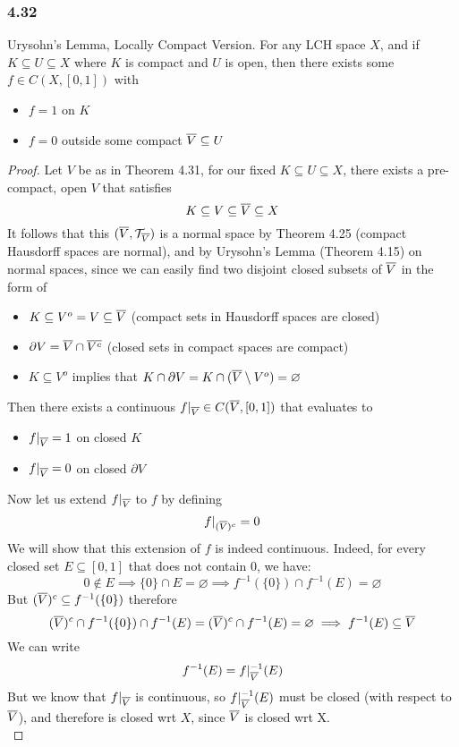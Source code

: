 \documentclass[../../main.tex]{subfiles}
\begin{document}
\subsubsection*{4.32}
\begin{wts}
    Urysohn's Lemma, Locally Compact Version. For any LCH space $X$, and if $K\subseteq U\subseteq X$ where $K$ is compact and $U$ is open, then there exists some $f\in C(X,[0,1])$ with \begin{itemize}
        \item $f=1$ on $K$
        \item $f=0$ outside some compact $\overline{V}\subseteq U$
    \end{itemize}
\end{wts}
\newcommand{\restrictV}{|_{\cl{V}}}
\begin{proof}
    Let $V$ be as in Theorem 4.31, for our fixed $K\subseteq U\subseteq X$, there exists a pre-compact, open $V$ that satisfies
    \[
    K\subseteq V\subseteq \overline{V}\subseteq X
    \]
    It follows that this $(\overline{V},\mathcal{T}_{\overline{V}})$ is a normal space by Theorem 4.25 (compact Hausdorff spaces are normal), and by Urysohn's Lemma (Theorem 4.15) on normal spaces, since we can easily find two disjoint closed subsets of $\overline{V}$ in the form of \begin{itemize}
        \item $K\subseteq V^o = V\subseteq \overline{V}$ (compact sets in Hausdorff spaces are closed)
        \item $\partial V=\overline{V}\cap\overline{V^c}$ (closed sets in compact spaces are compact)
        \item $K\subseteq V^o$ implies that $K\cap\partial V =K\cap(\overline{V}\setminus V^o)= \varnothing$
    \end{itemize}
    Then there exists a continuous $f\restrictV\in C(\cl{V},[0,1])$ that evaluates to
    \begin{itemize}
        \item $f\restrictV = 1$ on closed $K$
        \item $f\restrictV = 0$ on closed $\partial V$
    \end{itemize}
    Now let us extend $f\restrictV$ to $f$ by defining 
    \[
    f|_{(\overline{V})^c} = 0
    \]
    We will show that this extension of $f$ is indeed continuous. Indeed, for every closed set $E\subseteq [0,1]$ that does not contain $0$, we have:
    \[
    0\notin E\implies \{0\}\cap E=\varnothing\implies f^{-1}(\{0\})\cap f^{-1}(E)=\varnothing
    \]
    But $(\overline{V})^c\subseteq f^{-1}(\{0\})$ therefore
    \[
    (\overline{V})^c\cap f^{-1}(\{0\})\cap f^{-1}(E)=(\overline{V})^c\cap f^{-1}(E)=\varnothing\implies f^{-1}(E)\subseteq \overline{V}
    \]
    We can write
    \[
    f^{-1}(E)=f\restrictV^{-1}(E)
    \]
    But we know that $f\restrictV$ is continuous, so $f\restrictV^{-1}(E)$ must be closed (with respect to $\overline{V}$), and therefore is closed wrt $X$, since $\overline{V}$ is closed wrt X.\\
    

\end{proof}
\end{document}
